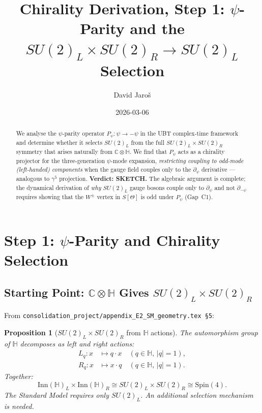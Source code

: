 \documentclass[12pt,a4paper]{article}
\title{\textbf{Chirality Derivation, Step 1: $\psi$-Parity and the
                 $SU(2)_L\times SU(2)_R \to SU(2)_L$ Selection}}
\author{David Jaro\v{s}}
\date{2026-03-06}
\newtheorem{proposition}[theorem]{Proposition}
\theoremstyle{definition}
\theoremstyle{remark}
\begin{document}
  \maketitle

  \begin{abstract}
  We analyse the $\psi$-parity operator $P_\psi:\psi\to -\psi$ in the UBT
  complex-time framework and determine whether it selects $SU(2)_L$ from the
  full $SU(2)_L\times SU(2)_R$ symmetry that arises naturally from
  $\mathbb{C}\otimes\mathbb{H}$.  We find that $P_\psi$ acts as a chirality
  projector for the three-generation $\psi$-mode expansion, \emph{restricting
  coupling to odd-mode (left-handed) components} when the gauge field couples
  only to the $\partial_\psi$ derivative --- analogous to $\gamma^5$ projection.
  \textbf{Verdict: SKETCH.}
  The algebraic argument is complete; the dynamical derivation of \emph{why}
  $SU(2)_L$ gauge bosons couple only to $\partial_\psi$ and not $\partial_{-\psi}$
  requires showing that the $W^\pm$ vertex in $S[\Theta]$ is odd under $P_\psi$
  (Gap~C1).
  \end{abstract}
\fi

\section{Step 1: $\psi$-Parity and Chirality Selection}
\label{sec:psi_parity}

\subsection{Starting Point: $\mathbb{C}\otimes\mathbb{H}$ Gives $SU(2)_L\times SU(2)_R$}
\label{subsec:biH_structure}

From \texttt{consolidation\_project/appendix\_E2\_SM\_geometry.tex~§5}:

\begin{proposition}[$SU(2)_L\times SU(2)_R$ from $\mathbb{H}$ actions]
\label{prop:su2lxsu2r}
The automorphism group of $\mathbb{H}$ decomposes as left and right actions:
\begin{align}
  L_q : x &\mapsto q\cdot x \quad (q\in\mathbb{H},\, |q|=1), \\
  R_q : x &\mapsto x\cdot q \quad (q\in\mathbb{H},\, |q|=1).
\end{align}
Together:
\begin{equation}
  \mathrm{Inn}(\mathbb{H})_L \times \mathrm{Inn}(\mathbb{H})_R
  \cong SU(2)_L \times SU(2)_R \cong \mathrm{Spin}(4).
\end{equation}
The Standard Model requires only $SU(2)_L$.  An additional selection mechanism
is needed.
\end{proposition}
\end{document}
